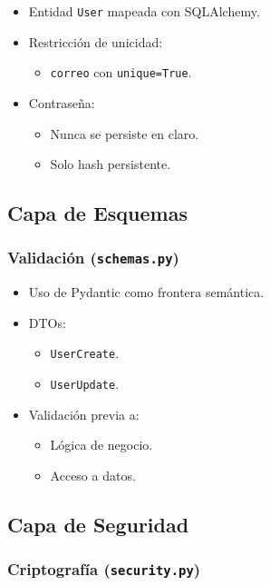 \documentclass[12pt,letterpaper]{article}
\begin{document}
\begin{itemize}
    \item Entidad \texttt{User} mapeada con SQLAlchemy.
    \item Restricción de unicidad:
    \begin{itemize}
        \item \texttt{correo} con \texttt{unique=True}.
    \end{itemize}
    \item Contraseña:
    \begin{itemize}
        \item Nunca se persiste en claro.
        \item Solo hash persistente.
    \end{itemize}
\end{itemize}

\subsection{Capa de Esquemas}

\subsubsection{Validación (\texttt{schemas.py})}

\begin{itemize}
    \item Uso de Pydantic como frontera semántica.
    \item DTOs:
    \begin{itemize}
        \item \texttt{UserCreate}.
        \item \texttt{UserUpdate}.
    \end{itemize}
    \item Validación previa a:
    \begin{itemize}
        \item Lógica de negocio.
        \item Acceso a datos.
    \end{itemize}
\end{itemize}

\subsection{Capa de Seguridad}

\subsubsection{Criptografía (\texttt{security.py})}
\end{document}
